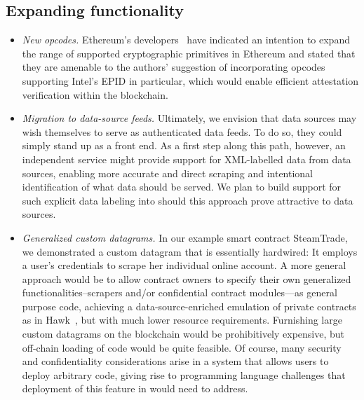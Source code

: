 \subsection{Expanding \tc functionality}

\begin{itemize}
\item{\em New opcodes.} Ethereum's developers~\cite{Buterinpersonal} have indicated an intention to expand the range of supported cryptographic primitives in Ethereum and stated that they are amenable to the authors' suggestion of incorporating opcodes supporting Intel's EPID in particular, which would enable efficient attestation verification within the blockchain. 
\item{\em Migration to data-source feeds.} Ultimately, we envision that data sources may wish themselves to serve as authenticated data feeds. To do so, they could simply stand up \tc as a front end. As a first step along this path, however, an independent \tc service might provide support for XML-labelled data from data sources, enabling more accurate and direct scraping and intentional identification of what data should be served. We plan to build support for such explicit data labeling into \tc should this approach prove attractive to data sources.
\item{\em Generalized custom datagrams.} In our example smart contract {\sf SteamTrade}, we demonstrated a custom datagram that is essentially hardwired: It employs a user's credentials to scrape her individual online account. A more general approach would be to allow contract owners to specify their own generalized functionalities--scrapers and/or confidential contract modules---as general purpose code, achieving a data-source-enriched emulation of private contracts as in Hawk~\cite{hawk}, but with much lower resource requirements. Furnishing large custom datagrams on the blockchain would be prohibitively expensive, but off-chain loading of code would be quite feasible. Of course, many security and confidentiality considerations arise in a system that allows users to deploy arbitrary code, giving rise to programming language challenges that deployment of this feature in \tc would need to address.
\end{itemize}


